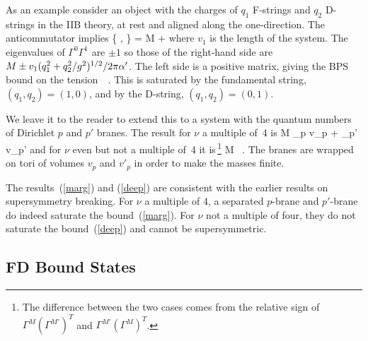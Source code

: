 As an example consider an object with the charges of $q_1$ F-strings
and $q_2$ D-strings in the IIB theory, at rest and aligned along the
one-direction.  The anticommutator implies
\be
\left\{  ,  \right\}
= \left[ \begin{array}{cc} 1&0 \\ 0&1 \end{array} \right] M +
\left[ \begin{array}{cc} q_1&q_2/g \\ q_2/g&-q_1 \end{array} \right]
\ee
where $v_1$ is the length of the system. 
The eigenvalues of $\Gamma^0 \Gamma^1$ are $\pm 1$ so those of the
right-hand side are $M \pm v_1 (q_1^2 + q_2^2/g^2)^{1/2}/2\pi\alpha'$.  The left
side is a positive matrix, giving the BPS bound on the tension\,\cite{schwarz}
\be
{} \geq {}\ . \label{fdbps}
\ee
This is saturated by the fundamental string, $(q_1,q_2) = (1,0)$, and by the
D-string, $(q_1,q_2) = (0,1)$. 

We leave it to the reader to extend this to a system with the quantum numbers
of Dirichlet $p$ and $p'$ branes. The result for $\nu$ a multiple of~4 is
\be
M \geq \tau_p v_p + \tau_{p'} v_{p'} \label{marg}
\ee
and for $\nu$ even but not a multiple of~4 it is\,\footnote{The difference
between the two cases comes from the relative sign of
$\Gamma^M (\Gamma^{M'})^T$ and $\Gamma^{M'} (\Gamma^{M})^T$. }
\be
M \geq {}\ .
\label{deep}
\ee
The branes are wrapped
on tori of volumes $v_p$ and $v'_p$ in order to make the masses finite.

The results~(\ref{marg}) and (\ref{deep}) are consistent with the earlier
results on supersymmetry breaking.  For $\nu$ a multiple of 4, a
separated $p$-brane and $p'$-brane do indeed saturate the
bound~(\ref{marg}).  For $\nu$ not a multiple of four, they do not saturate
the bound~(\ref{deep}) and cannot be supersymmetric.

\subsection{FD Bound States}

